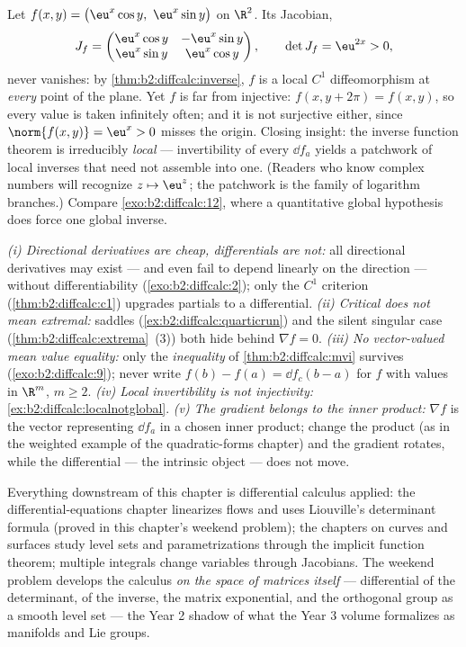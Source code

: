 \begin{example}\label{ex:b2:diffcalc:localnotglobal}
Let $f(x, y) = \bigl(\eu^x\cos y,\ \eu^x\sin y\bigr)$ on
$\R^2$. Its Jacobian,
\[
J_f = \begin{pmatrix}
\eu^x\cos y & -\eu^x\sin y\\
\eu^x\sin y & \eu^x\cos y
\end{pmatrix},
\qquad
\det J_f = \eu^{2x} > 0 ,
\]
never vanishes: by \cref{thm:b2:diffcalc:inverse}, $f$ is a
local $C^1$ diffeomorphism at \emph{every} point of the plane.
Yet $f$ is far from injective: $f(x, y + 2\pi) = f(x, y)$, so
every value is taken infinitely often; and it is not surjective
either, since $\norm{f(x, y)} = \eu^x > 0$ misses the origin.
Closing insight: the inverse function theorem is irreducibly
\emph{local} --- invertibility of every $\dd f_a$ yields a
patchwork of local inverses that need not assemble into one.
(Readers who know complex numbers will recognize $z \mapsto
\eu^z$; the patchwork is the family of logarithm branches.)
Compare \cref{exo:b2:diffcalc:12}, where a quantitative global
hypothesis does force one global inverse.
\end{example}

\begin{remark}
\emph{(i) Directional derivatives are cheap, differentials are
not:} all directional derivatives may exist --- and even fail
to depend linearly on the direction --- without
differentiability (\cref{exo:b2:diffcalc:2}); only the $C^1$
criterion
(\cref{thm:b2:diffcalc:c1}) upgrades partials to a
differential. \emph{(ii) Critical does not mean extremal:}
saddles (\cref{ex:b2:diffcalc:quarticrun}) and the silent
singular case (\cref{thm:b2:diffcalc:extrema}~(3)) both hide
behind $\nabla f = 0$. \emph{(iii) No vector-valued mean value
equality:} only the \emph{inequality} of
\cref{thm:b2:diffcalc:mvi} survives
(\cref{exo:b2:diffcalc:9}); never write $f(b) - f(a) = \dd
f_c(b-a)$ for $f$ with values in $\R^m$, $m \geq 2$.
\emph{(iv) Local invertibility is not injectivity:}
\cref{ex:b2:diffcalc:localnotglobal}. \emph{(v) The gradient
belongs to the inner product:} $\nabla f$ is the vector
representing $\dd f_a$ in a chosen inner product; change the
product (as in the weighted example of the quadratic-forms
chapter) and the gradient rotates, while the differential ---
the intrinsic object --- does not move.
\end{remark}

\begin{remark}
Everything downstream of this chapter is differential calculus
applied: the differential-equations chapter linearizes flows and
uses Liouville's determinant formula (proved in this chapter's
weekend problem); the chapters on curves and surfaces study
level sets and parametrizations through the implicit function
theorem; multiple integrals change variables through Jacobians.
The weekend problem develops the calculus \emph{on the space of
matrices itself} --- differential of the determinant, of the
inverse, the matrix exponential, and the orthogonal group as a
smooth level set --- the Year 2 shadow of what the Year 3
volume formalizes as manifolds and Lie groups.
\end{remark}

